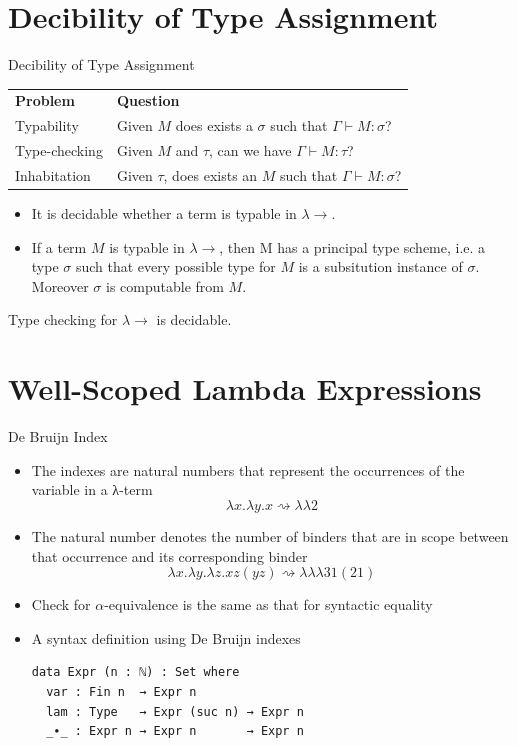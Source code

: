 \documentclass[10pt, xetex, hyperref={pdfpagelabels=false}]{beamer}
\begin{document}
\section{Decibility of Type Assignment}
\begin{frame}{Decibility of Type Assignment~\citep{barendregt2013lambda}}

\begin{tabular}{ll}
{\color{blu} \textbf{Problem}} & {\color{blu} \textbf{Question}} \\
{\color{blu} Typability}       & Given $M$ does exists a $σ$ such that $Γ ⊢ M : σ$? \\
{\color{blu} Type-checking}    & Given $M$ and $τ$, can we have $Γ ⊢ M : τ$?  \\
{\color{blu} Inhabitation}     & Given $τ$, does exists an $M$ such that $Γ ⊢ M : σ$?\\
\end{tabular}

\begin{theorem}%
\begin{itemize}
\item It is decidable whether a term is typable in $\lambda\rightarrow$.
\item If a term $M$ is typable in $\lambda\rightarrow$, then M has a principal type scheme, i.e.
a type $σ$ such that every possible type for $M$ is a subsitution instance of $σ$.
Moreover $σ$ is computable from $M$.
\end{itemize}
\end{theorem}

\begin{theorem}%
Type checking for $\lambda\rightarrow$ is decidable.
\end{theorem}

\end{frame}

\section{Well-Scoped Lambda Expressions}
\begin{frame}[fragile]{De Bruijn Index}
\begin{itemize}
\item The indexes are natural numbers that represent the occurrences of the variable in a λ-term
$$  λx. λy. x ⇝  λ λ 2$$
\item The natural number denotes the number of binders that are in scope between that occurrence and its corresponding binder
$$λx. λy. λz. x z (y z)  ⇝ λ λ λ 3 1 (2 1)$$
\item Check for $α$-equivalence is the same as that for syntactic equality
\item A syntax definition using De Bruijn indexes\\[3mm]
\begin{verbatim}
data Expr (n : ℕ) : Set where
  var : Fin n  → Expr n
  lam : Type   → Expr (suc n) → Expr n
  _∙_ : Expr n → Expr n       → Expr n
\end{verbatim}
\end{itemize}
\end{frame}
\end{document}
